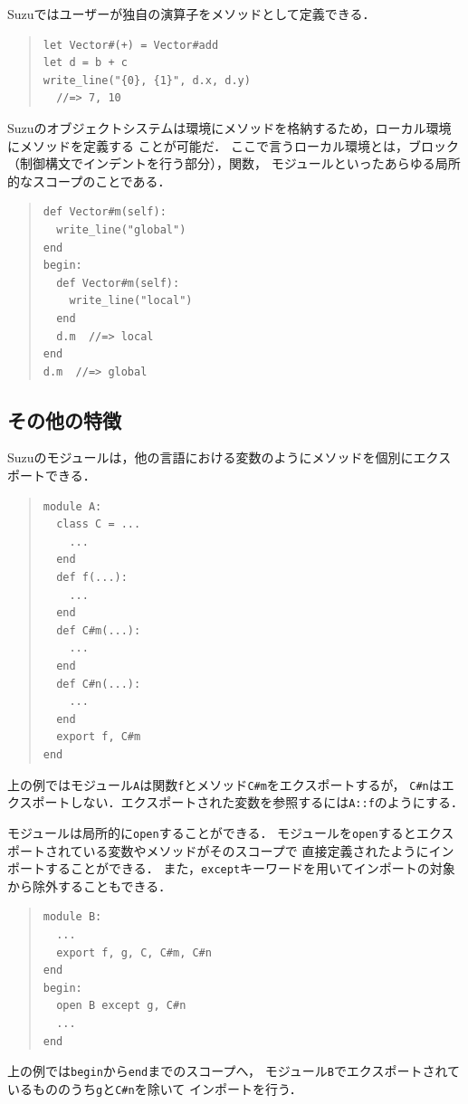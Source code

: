 \documentclass{ipsjprosym}
\begin{document}
Suzuではユーザーが独自の演算子をメソッドとして定義できる．
\begin{quote}
\begin{verbatim}
let Vector#(+) = Vector#add
let d = b + c
write_line("{0}, {1}", d.x, d.y)
  //=> 7, 10
\end{verbatim}
\end{quote}

Suzuのオブジェクトシステムは環境にメソッドを格納するため，ローカル環境にメソッドを定義する
ことが可能だ．
ここで言うローカル環境とは，ブロック（制御構文でインデントを行う部分），関数，
モジュールといったあらゆる局所的なスコープのことである．
\begin{quote}
\begin{verbatim}
def Vector#m(self):
  write_line("global")
end
begin:
  def Vector#m(self):
    write_line("local")
  end
  d.m  //=> local
end
d.m  //=> global
\end{verbatim}
\end{quote}

\subsection{その他の特徴}

Suzuのモジュールは，他の言語における変数のようにメソッドを個別にエクスポートできる．
\begin{quote}
\begin{verbatim}
module A:
  class C = ...
    ...
  end
  def f(...):
    ...
  end
  def C#m(...):
    ...
  end
  def C#n(...):
    ...
  end
  export f, C#m
end
\end{verbatim}
\end{quote}
上の例ではモジュール\verb|A|は関数\verb|f|とメソッド\verb|C#m|をエクスポートするが，
\verb|C#n|はエクスポートしない．エクスポートされた変数を参照するには\verb|A::f|のようにする．

モジュールは局所的に\verb|open|することができる．
モジュールを\verb|open|するとエクスポートされている変数やメソッドがそのスコープで
直接定義されたようにインポートすることができる．
また，\verb|except|キーワードを用いてインポートの対象から除外することもできる．
\begin{quote}
\begin{verbatim}
module B:
  ...
  export f, g, C, C#m, C#n
end
begin:
  open B except g, C#n
  ...
end
\end{verbatim}
\end{quote}
上の例では\verb|begin|から\verb|end|までのスコープへ，
モジュール\verb|B|でエクスポートされているもののうち\verb|g|と\verb|C#n|を除いて
インポートを行う．
\end{document}

